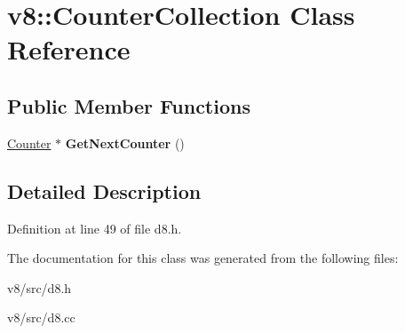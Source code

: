 \hypertarget{classv8_1_1CounterCollection}{}\section{v8\+:\+:Counter\+Collection Class Reference}
\label{classv8_1_1CounterCollection}
\subsection*{Public Member Functions}
\begin{DoxyCompactItemize}
\item 
\mbox{\label{classv8_1_1CounterCollection_a8233c61ab7e4db3d340be7ab7c1bbc1c}} 
\mbox{\hyperlink{classv8_1_1Counter}{Counter}} $\ast$ {\bfseries Get\+Next\+Counter} ()
\end{DoxyCompactItemize}


\subsection{Detailed Description}


Definition at line 49 of file d8.\+h.



The documentation for this class was generated from the following files\+:\begin{DoxyCompactItemize}
\item 
v8/src/d8.\+h\item 
v8/src/d8.\+cc\end{DoxyCompactItemize}
